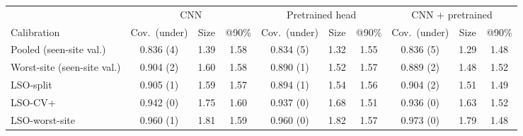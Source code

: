 \begin{tabular}{lccccccccc}
\toprule
& \multicolumn{3}{c}{CNN} & \multicolumn{3}{c}{Pretrained head} & \multicolumn{3}{c}{CNN + pretrained} \\
\cmidrule(lr){2-4}\cmidrule(lr){5-7}\cmidrule(lr){8-10}
Calibration & Cov.\ (under) & Size & @90\% & Cov.\ (under) & Size & @90\% & Cov.\ (under) & Size & @90\% \\
\midrule
Pooled (seen-site val.) & 0.836 (4) & 1.39 & 1.58 & 0.834 (5) & 1.32 & 1.55 & 0.836 (5) & 1.29 & 1.48 \\
Worst-site (seen-site val.) & 0.904 (2) & 1.60 & 1.58 & 0.890 (1) & 1.52 & 1.57 & 0.889 (2) & 1.48 & 1.52 \\
LSO-split & 0.905 (1) & 1.59 & 1.57 & 0.894 (1) & 1.54 & 1.56 & 0.904 (2) & 1.51 & 1.49 \\
LSO-CV+ & 0.942 (0) & 1.75 & 1.60 & 0.937 (0) & 1.68 & 1.51 & 0.936 (0) & 1.63 & 1.52 \\
LSO-worst-site & 0.960 (1) & 1.81 & 1.59 & 0.960 (0) & 1.82 & 1.57 & 0.973 (0) & 1.79 & 1.48 \\
\bottomrule
\end{tabular}